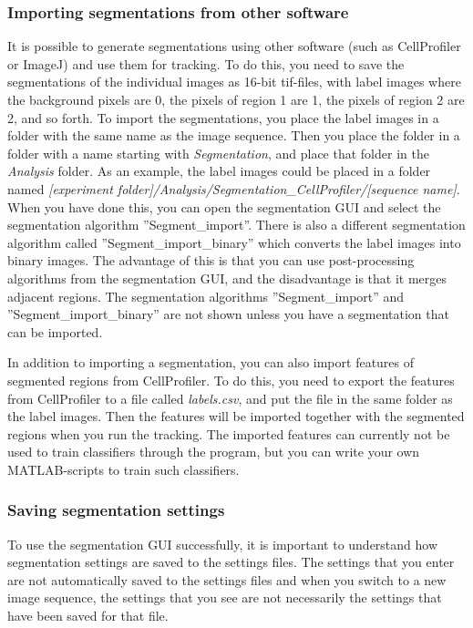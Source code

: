 \documentclass[a4paper, oneside, onecolumn, 11pt]{article}
\newcommand{\file}[1]{\emph{#1}}
\newcommand{\setting}[1]{''#1''}
\begin{document}
\subsubsection{Importing segmentations from other software}
It is possible to generate segmentations using other software (such as CellProfiler or ImageJ) and use them for tracking. To do this, you need to save the segmentations of the individual images as 16-bit tif-files, with label images where the background pixels are 0, the pixels of region 1 are 1, the pixels of region 2 are 2, and so forth. To import the segmentations, you place the label images in a folder with the same name as the image sequence. Then you place the folder in a folder with a name starting with \file{Segmentation}, and place that folder in the \file{Analysis} folder. As an example, the label images could be placed in a folder named \file{[experiment folder]/Analysis/Segmentation\_CellProfiler/[sequence name]}. When you have done this, you can open the segmentation GUI and select the segmentation algorithm \setting{Segment\_import}. There is also a different segmentation algorithm called \setting{Segment\_import\_binary} which converts the label images into binary images. The advantage of this is that you can use post-processing algorithms from the segmentation GUI, and the disadvantage is that it merges adjacent regions. The segmentation algorithms \setting{Segment\_import} and \setting{Segment\_import\_binary} are not shown unless you have a segmentation that can be imported.

In addition to importing a segmentation, you can also import features of segmented regions from CellProfiler. To do this, you need to export the features from CellProfiler to a file called \file{labels.csv}, and put the file in the same folder as the label images. Then the features will be imported together with the segmented regions when you run the tracking. The imported features can currently not be used to train classifiers through the program, but you can write your own MATLAB-scripts to train such classifiers.

\subsubsection{Saving segmentation settings}
To use the segmentation GUI successfully, it is important to understand how segmentation settings are saved to the settings files. The settings that you enter are not automatically saved to the settings files and when you switch to a new image sequence, the settings that you see are not necessarily the settings that have been saved for that file.
\end{document}
